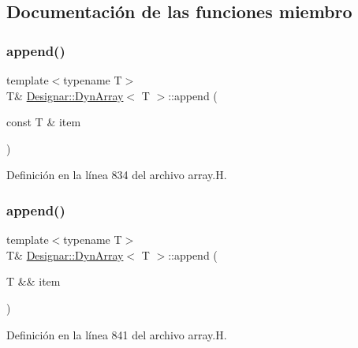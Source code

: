 \subsection{Documentación de las funciones miembro}
\mbox{\label{class_designar_1_1_dyn_array_a7134948ab46ec703595718a7734a83c5}} 
\subsubsection{\texorpdfstring{append()}{append()}\hspace{0.1cm}{\footnotesize\ttfamily [1/2]}}
{\footnotesize\ttfamily template$<$typename T$>$ \\
T\& \hyperlink{class_designar_1_1_dyn_array}{Designar\+::\+Dyn\+Array}$<$ T $>$\+::append (\begin{DoxyParamCaption}\item[{const T \&}]{item }\end{DoxyParamCaption})\hspace{0.3cm}{\ttfamily [inline]}}



Definición en la línea 834 del archivo array.\+H.

\mbox{\label{class_designar_1_1_dyn_array_a0e1583bf9d554b5553438dffd57bff93}} 
\subsubsection{\texorpdfstring{append()}{append()}\hspace{0.1cm}{\footnotesize\ttfamily [2/2]}}
{\footnotesize\ttfamily template$<$typename T$>$ \\
T\& \hyperlink{class_designar_1_1_dyn_array}{Designar\+::\+Dyn\+Array}$<$ T $>$\+::append (\begin{DoxyParamCaption}\item[{T \&\&}]{item }\end{DoxyParamCaption})\hspace{0.3cm}{\ttfamily [inline]}}



Definición en la línea 841 del archivo array.\+H.

